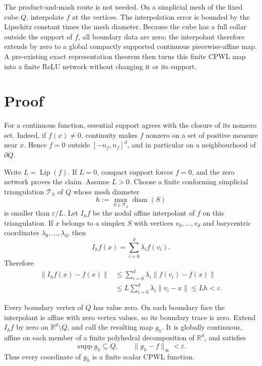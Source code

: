 \documentclass[11pt]{article}
\newcommand{\R}{\mathbb{R}}
\newcommand{\supp}{\operatorname{supp}}
\newcommand{\Lip}{\operatorname{Lip}}
\begin{document}
The product-and-mask route is not needed.  On a simplicial mesh of the fixed
cube \(Q\), interpolate \(f\) at the vertices.  The interpolation error is
bounded by the Lipschitz constant times the mesh diameter.  Because the cube
has a full collar outside the support of \(f\), all boundary data are zero;
the interpolant therefore extends by zero to a global compactly supported
continuous piecewise-affine map.  A pre-existing exact representation theorem
then turns this finite CPWL map into a finite ReLU network without changing it
or its support.

\section*{Proof}

For a continuous function, essential support agrees with the closure of its
nonzero set.  Indeed, if \(f(x)\neq0\), continuity makes \(f\) nonzero on a
set of positive measure near \(x\).  Hence \(f=0\) outside
\([-n_f,n_f]^d\), and in particular on a neighbourhood of \(\partial Q\).

Write \(L=\Lip(f)\).  If \(L=0\), compact support forces \(f=0\), and the
zero network proves the claim.  Assume \(L>0\).  Choose a finite conforming
simplicial triangulation \(\mathcal T_h\) of \(Q\) whose mesh diameter
\[
 h:=\max_{S\in\mathcal T_h}\operatorname{diam}(S)
\]
is smaller than \(\varepsilon/L\).  Let \(I_hf\) be the nodal affine
interpolant of \(f\) on this triangulation.  If \(x\) belongs to a simplex
\(S\) with vertices \(v_0,\dots,v_d\) and barycentric coordinates
\(\lambda_0,\dots,\lambda_d\), then
\[
 I_hf(x)=\sum_{i=0}^d\lambda_i f(v_i).
\]
Therefore
\[
 \begin{aligned}
 \lVert I_hf(x)-f(x)\rVert
 &\leq \sum_{i=0}^d\lambda_i\lVert f(v_i)-f(x)\rVert \\
 &\leq L\sum_{i=0}^d\lambda_i\lVert v_i-x\rVert
 \leq Lh<\varepsilon.
 \end{aligned}
\]

Every boundary vertex of \(Q\) has value zero.  On each boundary face the
interpolant is affine with zero vertex values, so its boundary trace is zero.
Extend \(I_hf\) by zero on \(\R^d\setminus Q\), and call the resulting map
\(g_h\).  It is globally continuous, affine on each member of a finite
polyhedral decomposition of \(\R^d\), and satisfies
\[
 \supp g_h\subseteq Q,
 \qquad \lVert g_h-f\rVert_\infty<\varepsilon.
\]
Thus every coordinate of \(g_h\) is a finite scalar CPWL function.
\end{document}
